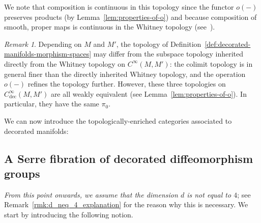 \documentclass[10pt,a4paper]{amsart}
\numberwithin{equation}{section}
\newcommand{\rdec}{\mathrm{dec}}
\newcommand{\cdec}{\ensuremath{C^\infty_{\rdec}}}
\theoremstyle{definition}
\theoremstyle{remark}
\newtheorem{rema}[theo]{Remark}
\begin{document}
We note that composition is continuous in this topology since the functor $o(-)$ preserves products (by Lemma~\ref{lem:properties-of-o}) and because composition of smooth, proper maps is continuous in the Whitney topology (see~\cite[\S~2, Prop.~1]{Mather1969}).

\begin{rema}
Depending on $M$ and $M'$, the topology of Definition~\ref{def:decorated-manifolds-morphism-spaces} may differ from the subspace topology inherited directly from the Whitney topology on $C^\infty(M,M')$: the colimit topology is in general finer than the directly inherited Whitney topology, and the operation $o(-)$ refines the topology further. However, these three topologies on $\cdec(M,M')$ are all weakly equivalent (see Lemma~\ref{lem:properties-of-o}). In particular, they have the same $\pi_{0}$.
\end{rema}

We can now introduce the topologically-enriched categories associated to decorated manifolds:


\setcounter{theo}{48}
\subsection{A Serre fibration of decorated diffeomorphism groups}\label{ss:fibration-condition}

\emph{From this point onwards, we assume that the dimension $d$ is not equal to $4$}; see Remark~\ref{rmk:d_neq_4_explanation} for the reason why this is necessary. We start by introducing the following notion.
\end{document}

